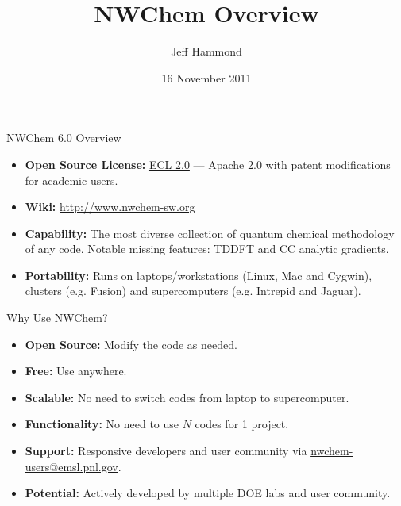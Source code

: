 \documentclass[11pt]{beamer}
\title[NWChem Overview]{NWChem Overview}
\author[Jeff Hammond]{Jeff Hammond}
\institute[Argonne]{Leadership Computing Facility \\ Argonne National Laboratory}
\date[16 Nov 2011]{16 November 2011}
\begin{document}
\frame{\titlepage}

  \begin{frame}{NWChem 6.0 Overview} \Large
    \begin{itemize}
        \item \textbf{Open Source License:} \href{http://www.opensource.org/licenses/ecl2.php}{ECL 2.0} --- Apache 2.0 with patent modifications for academic users.
        \item \textbf{Wiki:} \href{http://www.nwchem-sw.org}{http://www.nwchem-sw.org}
        \item \textbf{Capability:} The most diverse collection of quantum chemical methodology of any code.  Notable missing features: TDDFT and CC analytic gradients.
        \item \textbf{Portability:} Runs on laptops/workstations (Linux, Mac and Cygwin), clusters (e.g. Fusion) and supercomputers (e.g. Intrepid and Jaguar).
    \end{itemize}
  \end{frame}


  \begin{frame}{Why Use NWChem?} \Large
    \begin{itemize}
        \item \textbf{Open Source:} Modify the code as needed.
        \item \textbf{Free:} Use anywhere.
        \item \textbf{Scalable:} No need to switch codes from laptop to supercomputer.
        \item \textbf{Functionality:} No need to use $N$ codes for 1 project.
        \item \textbf{Support:} Responsive developers and user community via \href{mailto:nwchem-users@emsl.pnl.gov}{nwchem-users@emsl.pnl.gov}.
        \item \textbf{Potential:} Actively developed by multiple DOE labs and user community.
    \end{itemize}
  \end{frame}
\end{document}
